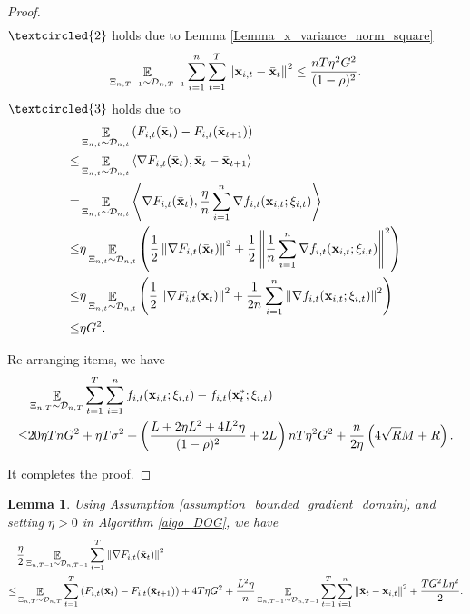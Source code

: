\documentclass{article}
\newtheorem{Lemma}{\bf{Lemma}}
\begin{document}
\begin{proof}
\begin{align}
\end{align} $\textcircled{2}$ holds due to Lemma \ref{Lemma_x_variance_norm_square}
\begin{align}
\nonumber
\mathop{\mathbb{E}}_{ \Xi_{n,T-1} \sim \mathcal{D}_{n,T-1} } \sum_{i=1}^n\sum_{t=1}^T \left\lVert{\bf x}_{i,t} - \bar{{\bf x}}_t\right\rVert^2 \le \frac{nT\eta^2 G^2 }{(1-\rho)^2}.
\end{align} $\textcircled{3}$ holds due to 
\begin{align}
\nonumber
& \mathop{\mathbb{E}}_{ \Xi_{n,t} \sim \mathcal{D}_{n,t} } \left( F_{i,t}(\bar{{\bf x}}_t) - F_{i,t}(\bar{{\bf x}}_{t+1})  \right) \\ \nonumber 
\le & \mathop{\mathbb{E}}_{ \Xi_{n,t} \sim \mathcal{D}_{n,t} } \left\langle\nabla F_{i,t}(\bar{{\bf x}}_t), \bar{{\bf x}}_t - \bar{{\bf x}}_{t+1} \right\rangle \\ \nonumber
= & \mathop{\mathbb{E}}_{ \Xi_{n,t} \sim \mathcal{D}_{n,t} } \left\langle\nabla F_{i,t}(\bar{{\bf x}}_t), \frac{\eta}{n}\sum_{i=1}^n\nabla f_{i,t}({\bf x}_{i,t};\xi_{i,t})  \right\rangle \\ \nonumber
\le & \eta\mathop{\mathbb{E}}_{ \Xi_{n,t} \sim \mathcal{D}_{n,t} }\left(  \frac{1}{2}\left\lVert\nabla F_{i,t}(\bar{{\bf x}}_t)\right\rVert^2 + \frac{1}{2} \left\lVert\frac{1}{n}\sum_{i=1}^n\nabla f_{i,t}({\bf x}_{i,t};\xi_{i,t})\right\rVert^2  \right)\\ \nonumber
\le & \eta\mathop{\mathbb{E}}_{ \Xi_{n,t} \sim \mathcal{D}_{n,t} }\left(  \frac{1}{2}\left\lVert\nabla F_{i,t}(\bar{{\bf x}}_t)\right\rVert^2 + \frac{1}{2n}\sum_{i=1}^n\left\lVert\nabla f_{i,t}({\bf x}_{i,t};\xi_{i,t})\right\rVert^2  \right)\\ \nonumber
\le & \eta G^2. 
\end{align}

Re-arranging items, we have
\begin{align}
\nonumber
& \mathop{\mathbb{E}}_{ \Xi_{n,T} \sim \mathcal{D}_{n,T} } \sum_{t=1}^T\sum_{i=1}^n f_{i,t}({\bf x}_{i,t};\xi_{i,t}) - f_{i,t}({\bf x}_t^\ast;\xi_{i,t}) \\ \nonumber
\le & 20\eta T n G^2 +  \eta T\sigma^2 + \left( \frac{L + 2\eta L^2  + 4L^2 \eta}{(1-\rho)^2} +2L \right)  nT\eta^2 G^2    + \frac{n}{2\eta}\left(  4\sqrt{R}M + R   \right).
\end{align}

It completes the proof.



\end{proof}




\begin{Lemma}
\label{Lemma_gradient_norm_bound}
Using Assumption \ref{assumption_bounded_gradient_domain}, and setting $\eta>0$ in Algorithm \ref{algo_DOG}, we have 
\begin{align}
& \frac{\eta}{2} \mathop{\mathbb{E}}_{ \Xi_{n,T-1} \sim \mathcal{D}_{n,T-1} }\sum_{t=1}^T \left\lVert\nabla F_{i,t}(\bar{{\bf x}}_t)\right\rVert^2 \\ \nonumber
\le & \mathop{\mathbb{E}}_{ \Xi_{n,T} \sim \mathcal{D}_{n,T} } \sum_{t=1}^T  \left( F_{i,t}(\bar{{\bf x}}_t) - F_{i,t}(\bar{{\bf x}}_{t+1}) \right) + 4T  \eta G^2 + \frac{ L^2 \eta}{n}\mathop{\mathbb{E}}_{ \Xi_{n,T-1} \sim \mathcal{D}_{n,T-1} }\sum_{t=1}^T\sum_{i=1}^n \left\lVert \bar{{\bf x}}_t - {\bf x}_{i,t} \right\rVert^2 + \frac{TG^2L\eta^2}{2}.
\end{align}
\end{Lemma}
\end{document}
